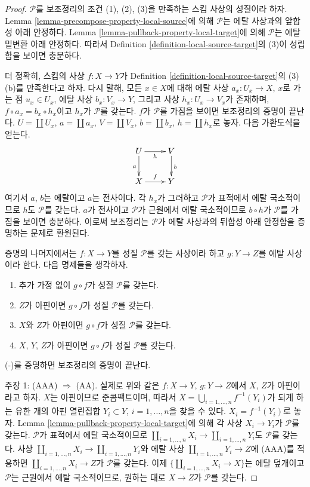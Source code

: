 \begin{proof}
$\mathcal{P}$를 보조정리의 조건 (1), (2), (3)을 만족하는 스킴 사상의
성질이라 하자. Lemma \ref{lemma-precompose-property-local-source}에
의해 $\mathcal{P}$는 에탈 사상과의 앞합성 아래 안정하다. Lemma
\ref{lemma-pullback-property-local-target}에 의해 $\mathcal{P}$는
에탈 밑변환 아래 안정하다. 따라서 Definition
\ref{definition-local-source-target}의 (3)이 성립함을 보이면 충분하다.

\medskip\noindent
더 정확히, 스킴의 사상 $f : X \to Y$가 Definition
\ref{definition-local-source-target}의 (3)(b)를 만족한다고 하자.
다시 말해, 모든 $x \in X$에 대해 에탈 사상 $a_x : U_x \to X$,
$x$로 가는 점 $u_x \in U_x$, 에탈 사상 $b_x : V_x \to Y$, 그리고
사상 $h_x : U_x \to V_x$가 존재하며,
$f \circ a_x = b_x \circ h_x$이고 $h_x$가 $\mathcal{P}$를 갖는다.
$f$가 $\mathcal{P}$를 가짐을 보이면
보조정리의 증명이 끝난다. $U = \coprod U_x$, $a = \coprod a_x$,
$V = \coprod V_x$, $b = \coprod b_x$, $h = \coprod h_x$로 놓자.
다음 가환도식을 얻는다.
$$
\xymatrix{
U \ar[d]_a \ar[r]_h & V \ar[d]^b \\
X \ar[r]^f & Y
}
$$
여기서 $a$, $b$는 에탈이고 $a$는 전사이다. 각 $h_x$가 그러하고
$\mathcal{P}$가 표적에서 에탈 국소적이므로 $h$도 $\mathcal{P}$를
갖는다. $a$가 전사이고 $\mathcal{P}$가
근원에서 에탈 국소적이므로 $b \circ h$가 $\mathcal{P}$를 가짐을
보이면 충분하다. 이로써 보조정리는 $\mathcal{P}$가 에탈 사상과의
뒤합성 아래 안정함을 증명하는 문제로 환원된다.

\medskip\noindent
증명의 나머지에서는 $f : X \to Y$를 성질 $\mathcal{P}$를 갖는
사상이라 하고 $g : Y \to Z$를 에탈 사상이라 한다. 다음 명제들을
생각하자.
\begin{enumerate}
\item[(-)] 추가 가정 없이 $g \circ f$가 성질 $\mathcal{P}$를 갖는다.
\item[(A)] $Z$가 아핀이면 $g \circ f$가 성질 $\mathcal{P}$를 갖는다.
\item[(AA)] $X$와 $Z$가 아핀이면 $g \circ f$가 성질
$\mathcal{P}$를 갖는다.
\item[(AAA)] $X$, $Y$, $Z$가 아핀이면 $g \circ f$가 성질
$\mathcal{P}$를 갖는다.
\end{enumerate}
(-)를 증명하면 보조정리의 증명이 끝난다.

\medskip\noindent
주장 1: (AAA) $\Rightarrow$ (AA).
실제로 위와 같은 $f : X \to Y$, $g : Y \to Z$에서 $X$, $Z$가
아핀이라고 하자. $X$는 아핀이므로 준콤팩트이며, 따라서
$X = \bigcup_{i = 1, \ldots, n} f^{-1}(Y_i)$가 되게 하는 유한 개의
아핀 열린집합 $Y_i \subset Y$, $i = 1, \ldots, n$을 찾을 수 있다.
$X_i = f^{-1}(Y_i)$로 놓자. Lemma
\ref{lemma-pullback-property-local-target}에 의해 각 사상
$X_i \to Y_i$가 $\mathcal{P}$를 갖는다. $\mathcal{P}$가 표적에서
에탈 국소적이므로
$\coprod_{i = 1, \ldots, n} X_i \to \coprod_{i = 1, \ldots, n} Y_i$도
$\mathcal{P}$를 갖는다. 사상
$\coprod_{i = 1, \ldots, n} X_i \to \coprod_{i = 1, \ldots, n} Y_i$와
에탈 사상
$\coprod_{i = 1, \ldots, n} Y_i \to Z$에 (AAA)를 적용하면
$\coprod_{i = 1, \ldots, n} X_i \to Z$가 $\mathcal{P}$를 갖는다.
이제 $\{\coprod_{i = 1, \ldots, n} X_i \to X\}$는 에탈 덮개이고
$\mathcal{P}$는 근원에서 에탈 국소적이므로, 원하는 대로
$X \to Z$가 $\mathcal{P}$를 갖는다.


\end{proof}
